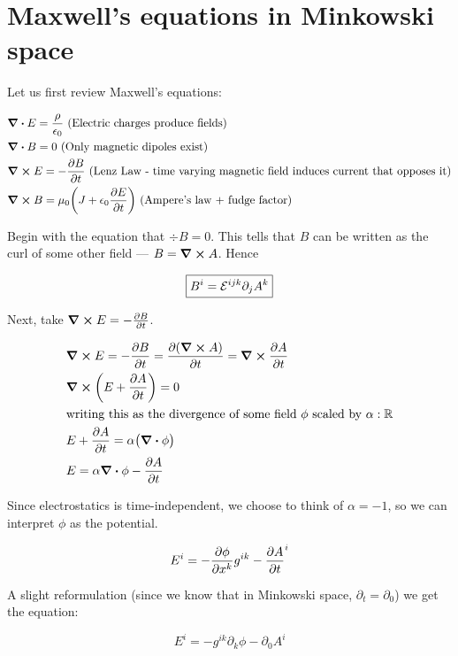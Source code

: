 \chapter{Maxwell's equations in Minkowski space}

Let us first review Maxwell's equations:

\begin{align*}
&\div E = \frac{\rho}{\epsilon_0}~\text{(Electric charges produce fields)}\\
&\div B = 0~\text{(Only magnetic dipoles exist)}\\
&\curl E = - \pdv{B}{t}~\text{(Lenz Law - time varying magnetic field induces current that opposes it)} \\
&\curl B =  \mu_0 \bigg(J + \epsilon_0 \pdv{E}{t} \bigg)~\text{(Ampere's law + fudge factor)}
\end{align*}

Begin with the equation that $\div B = 0$. This tells that $B$ can be written
as the curl of some other field --- $B = \curl A$. Hence

\begin{equation}
    \boxed{ B^i = \mathcal{E}^{ijk}  \partial_j A^k }
\end{equation}

Next, take $\curl E = - \pdv{B}{t}$.


\begin{align*}
&\curl E = - \pdv{B}{t} = \pdv{(\curl A)}{t} = \curl{\pdv{A}{t}} \\
&\curl (E + \pdv{A}{t}) = 0 \\
&\text{writing this as the divergence of some field $\phi$ scaled by $\alpha : \mathbb{R}$} \\
&E + \pdv{A}{t} = \alpha \big(\div \phi\big) \\
&E = \alpha \div \phi - \pdv{A}{t}
\end{align*}

Since electrostatics is time-independent, we choose to think of $\alpha = -1$, 
so we can interpret $\phi$ as the potential.

\begin{equation}
     E^i = - \pdv{\phi}{x^k}  g^{ik} - \pdv{A}{t}^i
\end{equation}

A slight reformulation (since we know that in Minkowski space, $\partial_t = \partial_0$)
we get the equation:


\begin{equation}
    \boxed{ E^i = - g^{ik} \partial_k \phi - \partial_0 A^i}
\end{equation}

